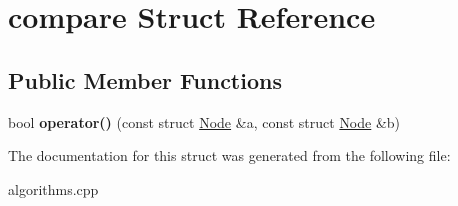 \hypertarget{structcompare}{\section{compare \-Struct \-Reference}
\label{structcompare}
}
\subsection*{\-Public \-Member \-Functions}
\begin{DoxyCompactItemize}
\item 
\hypertarget{structcompare_adf2ffcd2677cb2795df6371d1fdf51a3}{bool {\bfseries operator()} (const struct \hyperlink{structNode}{\-Node} \&a, const struct \hyperlink{structNode}{\-Node} \&b)}\label{structcompare_adf2ffcd2677cb2795df6371d1fdf51a3}

\end{DoxyCompactItemize}


\-The documentation for this struct was generated from the following file\-:\begin{DoxyCompactItemize}
\item 
algorithms.\-cpp\end{DoxyCompactItemize}
